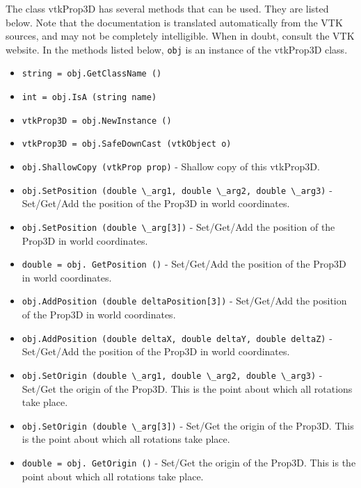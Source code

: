 The class vtkProp3D has several methods that can be used.
  They are listed below.
Note that the documentation is translated automatically from the VTK sources,
and may not be completely intelligible.  When in doubt, consult the VTK website.
In the methods listed below, \verb|obj| is an instance of the vtkProp3D class.
\begin{itemize}
\item  \verb|string = obj.GetClassName ()|

\item  \verb|int = obj.IsA (string name)|

\item  \verb|vtkProp3D = obj.NewInstance ()|

\item  \verb|vtkProp3D = obj.SafeDownCast (vtkObject o)|

\item  \verb|obj.ShallowCopy (vtkProp prop)| -  Shallow copy of this vtkProp3D.

\item  \verb|obj.SetPosition (double \_arg1, double \_arg2, double \_arg3)| -  Set/Get/Add the position of the Prop3D in world coordinates.

\item  \verb|obj.SetPosition (double \_arg[3])| -  Set/Get/Add the position of the Prop3D in world coordinates.

\item  \verb|double = obj. GetPosition ()| -  Set/Get/Add the position of the Prop3D in world coordinates.

\item  \verb|obj.AddPosition (double deltaPosition[3])| -  Set/Get/Add the position of the Prop3D in world coordinates.

\item  \verb|obj.AddPosition (double deltaX, double deltaY, double deltaZ)| -  Set/Get/Add the position of the Prop3D in world coordinates.

\item  \verb|obj.SetOrigin (double \_arg1, double \_arg2, double \_arg3)| -  Set/Get the origin of the Prop3D. This is the point about which all 
 rotations take place.

\item  \verb|obj.SetOrigin (double \_arg[3])| -  Set/Get the origin of the Prop3D. This is the point about which all 
 rotations take place.

\item  \verb|double = obj. GetOrigin ()| -  Set/Get the origin of the Prop3D. This is the point about which all 
 rotations take place.


\end{itemize}
